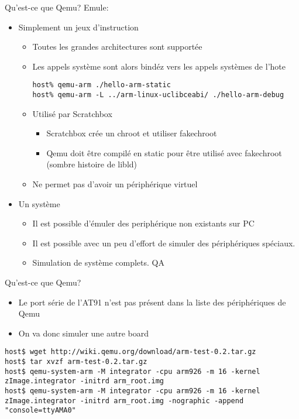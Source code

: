 \begin{frame}[fragile=singleslide]{Qu'est-ce que Qemu?}
  Emule:
  \begin{itemize}
  \item Simplement un jeux d'instruction 
    \begin{itemize}
    \item Toutes les grandes architectures sont supportée
    \item  Les  appels  système  sont  alors bindéz  vers  les  appels
      systèmes de l'hote
      \begin{lstlisting}
host% qemu-arm ./hello-arm-static
host% qemu-arm -L ../arm-linux-uclibceabi/ ./hello-arm-debug
      \end{lstlisting}
    \item Utilisé par Scratchbox
      \begin{itemize}
      \item Scratchbox crée un chroot et utiliser fakechroot
      \item Qemu  doit être compilé  en static pour être  utilisé avec
        fakechroot (sombre histoire de libld) %
      \end{itemize}
    \item Ne permet pas d'avoir un périphérique virtuel
    \end{itemize}
  \item Un système
    \begin{itemize}
    \item Il est possible  d'émuler des periphérique non existants sur
      PC
    \item  Il  est  possible  avec  un peu  d'effort  de  simuler  des
      périphériques spéciaux.
    \item Simulation de système complets. QA
    \end{itemize}
  \end{itemize}
\end{frame}

\begin{frame}[fragile=singleslide]{Qu'est-ce que Qemu?}
  \begin{itemize}
  \item Le  port série de l'AT91  n'est pas présent dans  la liste des
    périphériques de Qemu
  \item On va donc simuler une autre board
  \end{itemize}
  \begin{lstlisting}[basicstyle=\ttfamily\scriptsize\color{colBasic}]
host$ wget http://wiki.qemu.org/download/arm-test-0.2.tar.gz
host$ tar xvzf arm-test-0.2.tar.gz
host$ qemu-system-arm -M integrator -cpu arm926 -m 16 -kernel zImage.integrator -initrd arm_root.img
host$ qemu-system-arm -M integrator -cpu arm926 -m 16 -kernel zImage.integrator -initrd arm_root.img -nographic -append "console=ttyAMA0"
  \end{lstlisting}
\end{frame}

